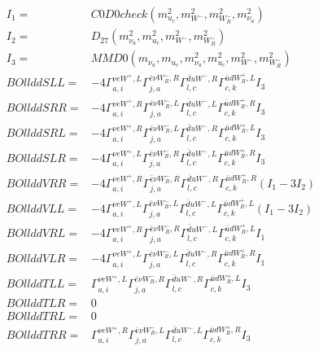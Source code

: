 \documentclass[A4,landscape]{article}
\begin{document}
\begin{align} 
I_1 = & C0D0check(m^2_{u_{{c}}}, m^2_{W^-}, m^2_{W_R^-}, m^2_{\nu_{{a}}}) \\ 
I_2 = & D_{27}(m^2_{\nu_{{a}}}, m^2_{u_{{c}}}, m^2_{W^-}, m^2_{W_R^-}) \\ 
I_3 = & MMD0(m_{\nu_{{a}}}, m_{u_{{c}}}, m^2_{\nu_{{a}}}, m^2_{u_{{c}}}, m^2_{W^-}, m^2_{W_R^-}) \\ 
  BOllddSLL= & -4  \Gamma^{\nu e W^+,L}_{a, i} \Gamma^{\bar{e}\nu W_R^- ,R}_{j, a} \Gamma^{\bar{d}u W^- ,R}_{l, c} \Gamma^{\bar{u}d W_R^+,L}_{c, k} I_3 \\ 
  BOllddSRR= & -4  \Gamma^{\nu e W^+,R}_{a, i} \Gamma^{\bar{e}\nu W_R^- ,L}_{j, a} \Gamma^{\bar{d}u W^- ,L}_{l, c} \Gamma^{\bar{u}d W_R^+,R}_{c, k} I_3 \\ 
  BOllddSRL= & -4  \Gamma^{\nu e W^+,R}_{a, i} \Gamma^{\bar{e}\nu W_R^- ,L}_{j, a} \Gamma^{\bar{d}u W^- ,R}_{l, c} \Gamma^{\bar{u}d W_R^+,L}_{c, k} I_3 \\ 
  BOllddSLR= & -4  \Gamma^{\nu e W^+,L}_{a, i} \Gamma^{\bar{e}\nu W_R^- ,R}_{j, a} \Gamma^{\bar{d}u W^- ,L}_{l, c} \Gamma^{\bar{u}d W_R^+,R}_{c, k} I_3 \\ 
  BOllddVRR= & -4  \Gamma^{\nu e W^+,R}_{a, i} \Gamma^{\bar{e}\nu W_R^- ,R}_{j, a} \Gamma^{\bar{d}u W^- ,R}_{l, c} \Gamma^{\bar{u}d W_R^+,R}_{c, k} (I_1 - 3 I_2) \\ 
  BOllddVLL= & -4  \Gamma^{\nu e W^+,L}_{a, i} \Gamma^{\bar{e}\nu W_R^- ,L}_{j, a} \Gamma^{\bar{d}u W^- ,L}_{l, c} \Gamma^{\bar{u}d W_R^+,L}_{c, k} (I_1 - 3 I_2) \\ 
  BOllddVRL= & -4  \Gamma^{\nu e W^+,R}_{a, i} \Gamma^{\bar{e}\nu W_R^- ,R}_{j, a} \Gamma^{\bar{d}u W^- ,L}_{l, c} \Gamma^{\bar{u}d W_R^+,L}_{c, k} I_1 \\ 
  BOllddVLR= & -4  \Gamma^{\nu e W^+,L}_{a, i} \Gamma^{\bar{e}\nu W_R^- ,L}_{j, a} \Gamma^{\bar{d}u W^- ,R}_{l, c} \Gamma^{\bar{u}d W_R^+,R}_{c, k} I_1 \\ 
  BOllddTLL= &  \Gamma^{\nu e W^+,L}_{a, i} \Gamma^{\bar{e}\nu W_R^- ,R}_{j, a} \Gamma^{\bar{d}u W^- ,R}_{l, c} \Gamma^{\bar{u}d W_R^+,L}_{c, k} I_3 \\ 
  BOllddTLR= & 0 \\ 
  BOllddTRL= & 0 \\ 
  BOllddTRR= &  \Gamma^{\nu e W^+,R}_{a, i} \Gamma^{\bar{e}\nu W_R^- ,L}_{j, a} \Gamma^{\bar{d}u W^- ,L}_{l, c} \Gamma^{\bar{u}d W_R^+,R}_{c, k} I_3 \\ 
\end{align} 
\end{document}
